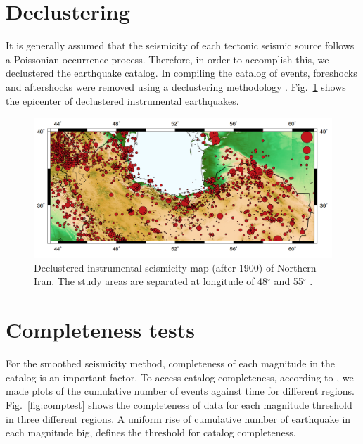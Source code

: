 \documentclass{article}
\begin{document}
\section{Declustering}

It is generally assumed that the seismicity of each tectonic seismic source follows a Poissonian occurrence process. Therefore, in order to accomplish this, we declustered the earthquake catalog. In compiling the catalog of events, foreshocks and aftershocks were removed using a declustering methodology \citep{Gardner1974}. Fig.~\ref{fig:instrumental} shows the epicenter of declustered instrumental  earthquakes.

\begin{figure} [H]
\centering
\includegraphics[scale=0.8]{figures/pdf/Figure3.pdf} 
\caption{Declustered instrumental seismicity map (after 1900) of Northern Iran. The study areas are separated at longitude of 48$^{\circ}$ and 55$^{\circ}$ . } 
\label{fig:instrumental}
\end{figure}





\section{Completeness tests}
For the smoothed seismicity method, completeness of each magnitude in the catalog is an important factor. To access catalog completeness, according to \citet{Frankel1995}, we made plots of the cumulative number of events against time for different regions.   Fig.~\ref{fig:comptest} shows the completeness of data for each magnitude threshold in three different regions.
A uniform rise of cumulative number of earthquake in each magnitude big, defines the threshold for catalog completeness.
\end{document}
